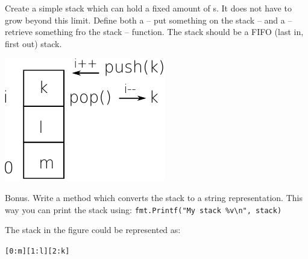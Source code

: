 \begin{Exercise}[title={Stack},difficulty=5]
\label{ex:stack}
\Question \label{ex:stack q1} Create a simple stack which can hold a
fixed amount of s. It does not have to grow beyond this limit.
Define both a  -- put something on the stack -- and a  
-- retrieve something fro the stack -- function. The stack should be
a FIFO (last in, first out) stack.

\begin{center}
\includegraphics[scale=0.90]{fig/stack.pdf}
\label{fig:stack}
\end{center}

\Question \label{ex:stack q2} Bonus. Write a  method which 
converts the stack to a string representation.  This way you can print the stack using:
\lstinline{fmt.Printf("My stack %v\n", stack)}

\noindent{}The stack in the figure could be represented as:
\begin{alltt}
[0:m] [1:l] [2:k]
\end{alltt}
\end{Exercise}

